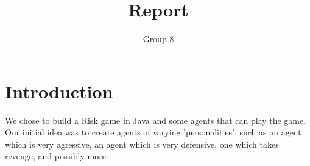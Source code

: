 \documentclass{article}
\author{Group 8}
\title{Report}
\begin{document}
\maketitle

\section{Introduction}
We chose to build a Risk game in Java and some agents that can play the game. Our initial idea was to create agents of varying 'personalities', such as an agent which is very agressive, an agent which is very defensive, one which takes revenge, and possibly more.
\end{document}

